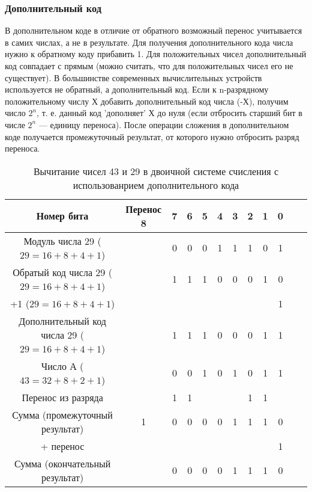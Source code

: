\documentclass[a4paper]{article}
\begin{document}
\subsubsection{Дополнительный код}
В дополнительном коде в отличие от  обратного возможный перенос учитывается в самих числах, а не в результате. Для получения дополнительного кода числа нужно к обратному коду прибавить 1. Для положительных чисел дополнительный код совпадает с прямым (можно считать, что для положительных чисел его не существует). В большинстве современных вычислительных устройств используется не обратный, а дополнительный код. Если к n-разрядному положительному числу Х добавить дополнительный код числа (-Х), получим число $2^{n}$, т. е. данный код 'дополняет' Х до нуля (если отбросить старший бит в числе $2^{n}$ --- единицу переноса). После операции сложения в дополнительном коде получается промежуточный результат, от которого нужно отбросить разряд переноса.


\begin{table}\label{tabel:sub_DP}
      \caption{Вычитание чисел 43 и 29 в двоичной системе счисления с использованрием дополнительного кода}
      \begin{center}
      \begin{tabular}{c * {11}{c}}
        \toprule
        Номер бита & Перенос 8 & 7 & 6 & 5 & 4 & 3 & 2 & 1 & 0 \\
        \toprule
        Модуль числа 29 ($29 = 16 + 8 + 4 + 1$) &  & 0 & 0 & 0 & 1 & 1 & 1 & 0 & 1\\
        \midrule
        Обратый код числа 29 ($29 = 16 + 8 + 4 + 1$) &  & 1 & 1 & 1 & 0 & 0 & 0 & 1 & 0\\
        \midrule
        +1 ($29 = 16 + 8 + 4 + 1$) &  &  &  &  &  &  &  &  & 1\\
        \midrule
        Дополнительный код числа 29 ($29 = 16 + 8 + 4 + 1$) &  & 1 & 1 & 1 & 0 & 0 & 0 & 1 & 1\\
        \midrule
        Число А ($43 = 32 + 8 + 2 + 1$) &  & 0 & 0 & 1 & 0 & 1 & 0 & 1 & 1\\
        \midrule
        Перенос из разряда &  & 1 & 1 &  &  &  & 1 & 1 & \\
        \midrule
        Сумма (промежуточный результат) & 1 & 0 & 0 & 0 & 0 & 1 & 1 & 1 & 0 \\
        \midrule
        + перенос &  &  &  &  &  &  &  &  & 1 \\
        \midrule
        Сумма (окончательный результат) &  & 0 & 0 & 0 & 0 & 1 & 1 & 1 & 0 \\
        \bottomrule
      \end{tabular}
    \end{center}
\end{table}
\end{document}
